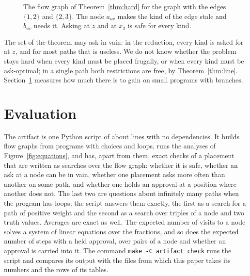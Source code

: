 \documentclass[acmsmall,nonacm,screen]{acmart}
\begin{document}
\begin{figure}
\centering
{}
\caption{The flow graph of Theorem~\ref{thm:hard} for the graph with the edges $\{1, 2\}$ and
$\{2, 3\}$. The node $a_{uv}$ makes the kind of the edge stale and $b_{uv}$ needs it. Asking
at $z$ and at $x_2$ is safe for every kind.}
\label{fig:reduction}
\end{figure}

The set of the theorem may ask in vain: in the reduction, every kind is asked for at $z$,
and for most paths that is useless. We do not know whether the problem stays hard when
every kind must be placed frugally, or when every kind must be ask-optimal; in a single
path both restrictions are free, by Theorem~\ref{thm:line}. Section~\ref{sec:eval} measures
how much there is to gain on small programs with branches.

\section{Evaluation}
\label{sec:eval}

The artifact is one Python script of about \exSize{} lines with no dependencies. It builds
flow graphs from programs with choices and loops, runs the analyses of
Figure~\ref{fig:equations}, and has, apart from them, exact checks of a placement that are
written as searches over the flow graph: whether it is safe, whether an ask at a node can
be in vain, whether one placement asks more often than another on some path, and whether
one holds an approval at a position where another does not. The last two are questions
about infinitely many paths when the program has loops; the script answers them exactly, the
first as a search for a path of positive weight and the second as a search over triples of
a node and two truth values. Averages are exact as well. The expected number of visits to a
node solves a system of linear equations over the fractions, and so does the expected
number of steps with a held approval, over pairs of a node and whether an approval is
carried into it. The command \texttt{make -C artifact
check} runs the script and compares its output with the files from which this paper takes
its numbers and the rows of its tables.
\end{document}
